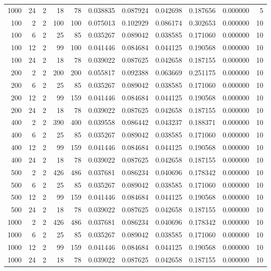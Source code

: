 \begin{table}
\begin{tabular}{rrrrrrrrrrr}
1000 & 24 & 2 & 18 & 78 & 0.038835 & 0.087924 & 0.042698 & 0.187656 & 0.000000 & 5 \\
100 & 2 & 2 & 100 & 100 & 0.075013 & 0.102929 & 0.086174 & 0.302653 & 0.000000 & 10 \\
100 & 6 & 2 & 25 & 85 & 0.035267 & 0.089042 & 0.038585 & 0.171060 & 0.000000 & 10 \\
100 & 12 & 2 & 99 & 100 & 0.041446 & 0.084684 & 0.044125 & 0.190568 & 0.000000 & 10 \\
100 & 24 & 2 & 18 & 78 & 0.039022 & 0.087625 & 0.042658 & 0.187155 & 0.000000 & 10 \\
200 & 2 & 2 & 200 & 200 & 0.055817 & 0.092388 & 0.063669 & 0.251175 & 0.000000 & 10 \\
200 & 6 & 2 & 25 & 85 & 0.035267 & 0.089042 & 0.038585 & 0.171060 & 0.000000 & 10 \\
200 & 12 & 2 & 99 & 159 & 0.041446 & 0.084684 & 0.044125 & 0.190568 & 0.000000 & 10 \\
200 & 24 & 2 & 18 & 78 & 0.039022 & 0.087625 & 0.042658 & 0.187155 & 0.000000 & 10 \\
400 & 2 & 2 & 390 & 400 & 0.039558 & 0.086442 & 0.043237 & 0.188371 & 0.000000 & 10 \\
400 & 6 & 2 & 25 & 85 & 0.035267 & 0.089042 & 0.038585 & 0.171060 & 0.000000 & 10 \\
400 & 12 & 2 & 99 & 159 & 0.041446 & 0.084684 & 0.044125 & 0.190568 & 0.000000 & 10 \\
400 & 24 & 2 & 18 & 78 & 0.039022 & 0.087625 & 0.042658 & 0.187155 & 0.000000 & 10 \\
500 & 2 & 2 & 426 & 486 & 0.037681 & 0.086234 & 0.040696 & 0.178342 & 0.000000 & 10 \\
500 & 6 & 2 & 25 & 85 & 0.035267 & 0.089042 & 0.038585 & 0.171060 & 0.000000 & 10 \\
500 & 12 & 2 & 99 & 159 & 0.041446 & 0.084684 & 0.044125 & 0.190568 & 0.000000 & 10 \\
500 & 24 & 2 & 18 & 78 & 0.039022 & 0.087625 & 0.042658 & 0.187155 & 0.000000 & 10 \\
1000 & 2 & 2 & 426 & 486 & 0.037681 & 0.086234 & 0.040696 & 0.178342 & 0.000000 & 10 \\
1000 & 6 & 2 & 25 & 85 & 0.035267 & 0.089042 & 0.038585 & 0.171060 & 0.000000 & 10 \\
1000 & 12 & 2 & 99 & 159 & 0.041446 & 0.084684 & 0.044125 & 0.190568 & 0.000000 & 10 \\
1000 & 24 & 2 & 18 & 78 & 0.039022 & 0.087625 & 0.042658 & 0.187155 & 0.000000 & 10 \\

\end{tabular}
\end{table}
